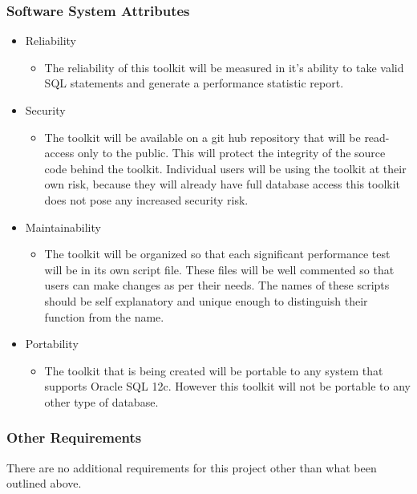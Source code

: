 \documentclass[draftclsnofoot, onecolumn, compsoc, 10pt]{IEEEtran}
\begin{document}
\subsubsection{Software System Attributes}
\begin{itemize}
    	\item Reliability 
        \begin{itemize}
        	\item The reliability of this toolkit will be measured in it's ability to take valid SQL statements and generate a performance statistic report.
        \end{itemize}
        \item Security
        \begin{itemize}
        	\item The toolkit will be available on a git hub repository that will be read-access only to the public. 
			  This will protect the integrity of the source code behind the toolkit. 
		      Individual users will be using the toolkit at their own risk, because they will already have full database access this toolkit does not pose any increased security risk. 
        \end{itemize}
        \item Maintainability
        \begin{itemize}
        	\item The toolkit will be organized so that each significant performance test will be in its own script file. 
				  These files will be well commented so that users can make changes as per their needs. 
				  The names of these scripts should be self explanatory and unique enough to distinguish their function from the name.
		\end{itemize}
        \item Portability
        \begin{itemize}
        	\item The toolkit that is being created will be portable to any system that supports Oracle SQL 12c.
            	  However this toolkit will not be portable to any other type of database.
        \end{itemize}
    \end{itemize}
    
\subsubsection{Other Requirements} 
There are no additional requirements for this project other than what been outlined above.
\end{document}
